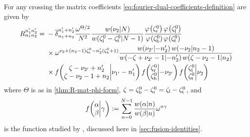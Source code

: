 \documentclass{sl2ams}
\numberwithin{equation}{section}
\begin{document}
\begin{lemma}
  \label{thm:fourier-dual-lemma-general}
  For any crossing the matrix coefficients \eqref{eq:fourier-dual-coefficients-definition} are given by
  \begin{equation}
    \label{eq:fourier-dual-coefficients}
    \begin{aligned}
      R_{n_1 n_2}^{n_1' n_2'}
      =
      {}
      &
      -
      \nrdel{n_1 + n_2}{n_1' +  n_2'}
      \frac{
        \omega^{\Theta/2}
      }{
        \nr^{2}
      }
      \frac{
        \qlog{\nu_{2}}{\nr}
      }{
        \qlog{\zeta_{\lS}^{0} - \zeta_{\lW}^{0}}{\nr - 1}
      }
      \frac{
        \pf{\zeta_{\lN}^0}
        \pf{\zeta_{\lS}^0}
      }{
        \pf{\zeta_{\lE}^0}
        \pf{\zeta_{\lW}^0}
      }
      \\
      &\times
      \omega^{\nu_{2} + (n_{2} - 1) \zeta_{\lW}^{0} - n_{2}' (\zeta_{\lE}^{0} + 1) }
      \frac{
        \qlog{\nu_{2'}}{-n_2'}
        \qlog{-\nu_{2}}{n_2 - 1}
      }{
        \qlog{-\zeta + \nu_{2'} - 1}{- n_2'}
        \qlog{\zeta - \nu_{2} - 1}{n_2 }
      }
      \\
      &\times
      \fstack{ \zeta - \nu_{2'} + n_{2}' }{ \zeta - \nu_{2} -1 + n_{2} }{ \nu_{1'} - n_{1}' }
      \fstack{\zeta_{\lN}^0 }{\zeta_{\lE}^0}{- \nu_{2'}}
      \fstack{\zeta_{\lS}^0 }{\zeta_{\lW}^0}{\nu_{2}}
    \end{aligned}
\end{equation}
where \(\Theta\) is as in \cref{thm:R-mat-phi-form},
\(\zeta = \zeta_{\mathrm{b}}^{0} - \zeta_{\mathrm{r}}^{0} = \zeta_{\mathrm{l}} - \zeta_{\mathrm{t}}^{0}\), 
and 
\[
  f\mathopen{}\left( \begin{matrix} \alpha \\ \beta \end{matrix}\middle| \gamma \right) \mathrel{:=}
  \sum_{n = 0}^{N -1}
  \frac{
    w\mathopen{}\left(\alpha \middle | n \right)
    }{
    w\mathopen{}\left(\beta \middle | n \right)
  }
  \omega^{n \gamma}
\]
is the function studied by \textcite{Kashaev1993}, discussed here in \cref{sec:fusion-identities}.
\end{lemma}
\end{document}

